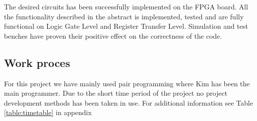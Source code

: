 The desired circuits has been successfully implemented on the FPGA board. All the functionality described in the abstract is implemented, tested and are fully functional on Logic Gate Level and Register Transfer Level. Simulation and test benches have proven their positive effect on the correctness of the code.

\subsection{Work proces} 
For this project we have mainly used pair programming where Kim has been the main programmer.
Due to the short time period of the project no project development methods has been taken in use.
For additional information see Table \ref{table:timetable} in appendix 
